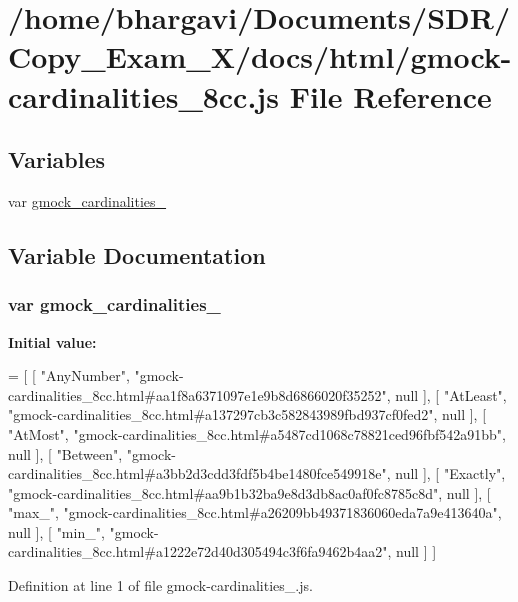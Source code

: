 \hypertarget{gmock-cardinalities__8cc_8js}{}\section{/home/bhargavi/\+Documents/\+S\+D\+R/\+Copy\+\_\+\+Exam\+\_\+X/docs/html/gmock-\/cardinalities\+\_\+8cc.js File Reference}
\label{gmock-cardinalities__8cc_8js}
\subsection*{Variables}
\begin{DoxyCompactItemize}
\item 
var \hyperlink{gmock-cardinalities__8cc_8js_ab2b4ddaaf20b9c0a6b724440153117b3}{gmock\+\_\+cardinalities\+\_}
\end{DoxyCompactItemize}


\subsection{Variable Documentation}
\subsubsection[{\texorpdfstring{gmock\+\_\+cardinalities\+\_\+8cc}{gmock_cardinalities_8cc}}]{\setlength{\rightskip}{0pt plus 5cm}var gmock\+\_\+cardinalities\+\_}\hypertarget{gmock-cardinalities__8cc_8js_ab2b4ddaaf20b9c0a6b724440153117b3}{}\label{gmock-cardinalities__8cc_8js_ab2b4ddaaf20b9c0a6b724440153117b3}
{\bfseries Initial value\+:}
\begin{DoxyCode}
=
[
    [ \textcolor{stringliteral}{"AnyNumber"}, \textcolor{stringliteral}{"gmock-cardinalities\_8cc.html#aa1f8a6371097e1e9b8d6866020f35252"}, null ],
    [ \textcolor{stringliteral}{"AtLeast"}, \textcolor{stringliteral}{"gmock-cardinalities\_8cc.html#a137297cb3c582843989fbd937cf0fed2"}, null ],
    [ \textcolor{stringliteral}{"AtMost"}, \textcolor{stringliteral}{"gmock-cardinalities\_8cc.html#a5487cd1068c78821ced96fbf542a91bb"}, null ],
    [ \textcolor{stringliteral}{"Between"}, \textcolor{stringliteral}{"gmock-cardinalities\_8cc.html#a3bb2d3cdd3fdf5b4be1480fce549918e"}, null ],
    [ \textcolor{stringliteral}{"Exactly"}, \textcolor{stringliteral}{"gmock-cardinalities\_8cc.html#aa9b1b32ba9e8d3db8ac0af0fc8785c8d"}, null ],
    [ \textcolor{stringliteral}{"max\_"}, \textcolor{stringliteral}{"gmock-cardinalities\_8cc.html#a26209bb49371836060eda7a9e413640a"}, null ],
    [ \textcolor{stringliteral}{"min\_"}, \textcolor{stringliteral}{"gmock-cardinalities\_8cc.html#a1222e72d40d305494c3f6fa9462b4aa2"}, null ]
]
\end{DoxyCode}


Definition at line 1 of file gmock-\/cardinalities\+\_.\+js.

